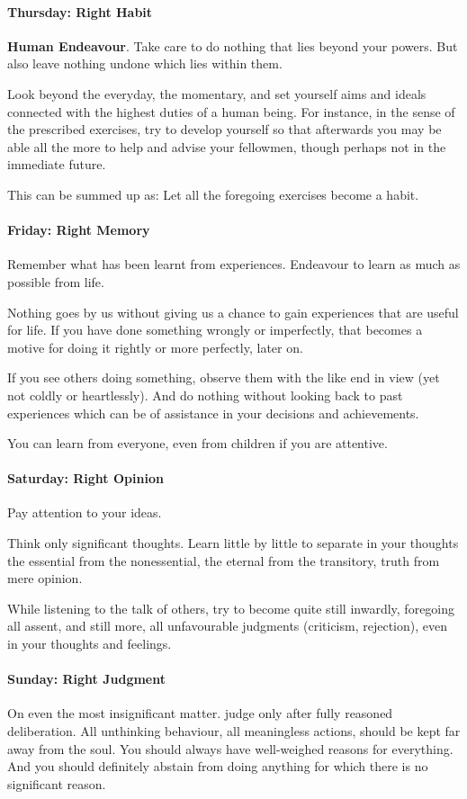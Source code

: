 \paragraph{Thursday: Right Habit}
\textbf{Human Endeavour}. Take care to do nothing that lies beyond your powers. But also leave nothing undone which lies within them.

Look beyond the everyday, the momentary, and set yourself aims and ideals connected with the highest duties of a human being. For instance, in the sense of the prescribed exercises, try to develop yourself so that afterwards you may be able all the more to help and advise your fellowmen, though perhaps not in the immediate future.

This can be summed up as: Let all the foregoing exercises become a habit.

\paragraph{Friday: Right Memory}
Remember what has been learnt from experiences. Endeavour to learn as much as possible from life.

Nothing goes by us without giving us a chance to gain experiences that are useful for life. If you have done something wrongly or imperfectly, that becomes a motive for doing it rightly or more perfectly, later on.

If you see others doing something, observe them with the like end in view (yet not coldly or heartlessly). And do nothing without looking back to past experiences which can be of assistance in your decisions and achievements.

You can learn from everyone, even from children if you are attentive.

\paragraph{Saturday: Right Opinion}
Pay attention to your ideas.

Think only significant thoughts. Learn little by little to separate in your thoughts the essential from the nonessential, the eternal from the transitory, truth from mere opinion.

While listening to the talk of others, try to become quite still inwardly, foregoing all assent, and still more, all unfavourable judgments (criticism, rejection), even in your thoughts and feelings.

\paragraph{Sunday: Right Judgment}
On even the most insignificant matter. judge only after fully reasoned deliberation. All unthinking behaviour, all meaningless actions, should be kept far away from the soul. You should always have well-weighed reasons for everything. And you should definitely abstain from doing anything for which there is no significant reason.

